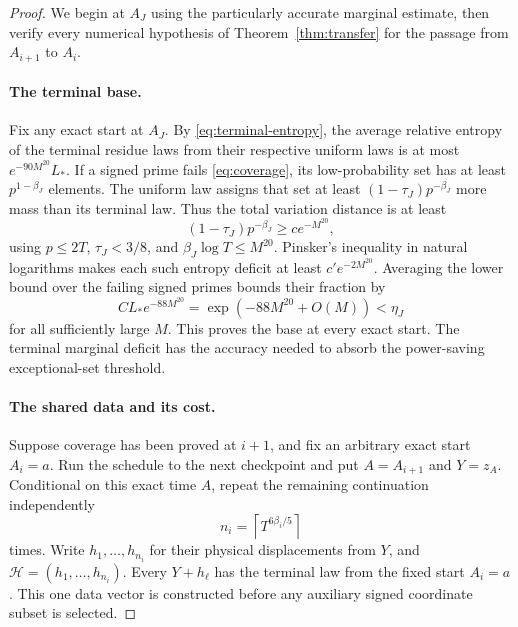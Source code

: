 \begin{proof}
We begin at \(A_J\) using the particularly accurate marginal estimate,
then verify every numerical hypothesis of Theorem~\ref{thm:transfer}
for the passage from \(A_{i+1}\) to \(A_i\).

\paragraph{The terminal base.}
Fix any exact start at \(A_J\).
By \eqref{eq:terminal-entropy}, the average relative entropy of the
terminal residue laws from their respective uniform laws is at most
\(e^{-90M^{20}}L_*\).
If a signed prime fails \eqref{eq:coverage}, its low-probability set
has at least \(p^{1-\beta_J}\) elements. The uniform law assigns that
set at least \((1-\tau_J)p^{-\beta_J}\) more mass than its terminal law.
Thus the total variation distance is at least
\[
 (1-\tau_J)p^{-\beta_J}
 \ge c e^{-M^{20}},
\]
using \(p\le2T\), \(\tau_J<3/8\), and
\(\beta_J\log T\le M^{20}\).
Pinsker's inequality in natural logarithms
\cite[Lemma 11.6.1]{CoverThomas} makes each such entropy deficit at least
\(c'e^{-2M^{20}}\).
Averaging the lower bound over the failing signed primes bounds their
fraction by
\[
 C L_*e^{-88M^{20}}
 =\exp(-88M^{20}+O(M))<\eta_J
\]
for all sufficiently large \(M\). This proves the base at every exact
start. The terminal marginal deficit has the accuracy needed to absorb
the power-saving exceptional-set threshold.

\paragraph{The shared data and its cost.}
Suppose coverage has been proved at \(i+1\), and fix an arbitrary
exact start \(A_i=a\). Run the schedule to the next checkpoint and put
\(A=A_{i+1}\) and \(Y=z_A\). Conditional on this exact time \(A\),
repeat the remaining continuation independently
\[
 n_i=\left\lceil T^{6\beta_i/5}\right\rceil
\]
times. Write \(h_1,\ldots,h_{n_i}\) for their physical displacements
from \(Y\), and \(\mathcal H=(h_1,\ldots,h_{n_i})\).
Every \(Y+h_\ell\) has the terminal law from the fixed start \(A_i=a\).
This one data vector is constructed before any auxiliary signed
coordinate subset is selected.


\end{proof}
